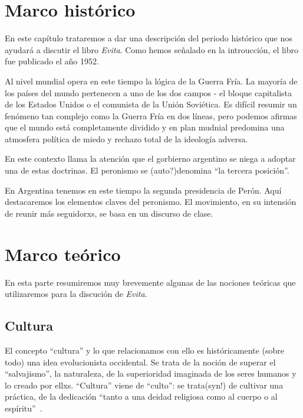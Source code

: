 \documentclass[
10pt, %
a4paper, %
oneside, %
headinclude,footinclude, %
]{scrartcl}
\begin{document}
\section{Marco histórico}

En este capítulo trataremos a dar una descripción del periodo histórico que nos ayudará a discutir el libro \textit{Evita}.
Como hemos señalado en la introucción, el libro fue publicado el año 1952.

Al nivel mundial opera en este tiempo la lógica de la Guerra Fría.
La mayoría de los países del mundo pertenecen a uno de los dos campos - el bloque capitalista de los Estados Unidos o el comunista de la Unión Soviética.
Es difícil resumir un fenómeno tan complejo como la Guerra Fría en dos líneas, pero podemos afirmas que el mundo está completamente dividido y en plan mudnial predomina una atmosfera política de miedo y rechazo total de la ideología adversa.

En este contexto llama la atención que el gorbierno argentino se niega a adoptar una de estas doctrinas.
El peronismo se (auto?)denomina ``la tercera posición''.

En Argentina tenemos en este tiempo la segunda presidencia de Perón.
Aquí destacaremos los elementos claves del peronismo.
El movimiento, en su intensión de reunir más seguidorxs, se basa en un discurso de clase.

\section{Marco teórico}

En esta parte resumiremos muy brevemente algunas de las nociones teóricas que utilizaremos para la discución de \textit{Evita}.

\subsection{Cultura}

El concepto ``cultura'' y lo que relacionamos con ello es históricamente (sobre todo) una idea evolucionista occidental.
Se trata de la noción de superar el ``salvajismo'', la naturaleza, de la superioridad imaginada de los seres humanos y lo creado por ellxs.
``Cultura'' viene de ``culto'': se trata(syn!) de cultivar una práctica, de la dedicación ``tanto a una deidad religiosa como al cuerpo o al espíritu''~\autocite[71]{SzIr2009}.
\end{document}
